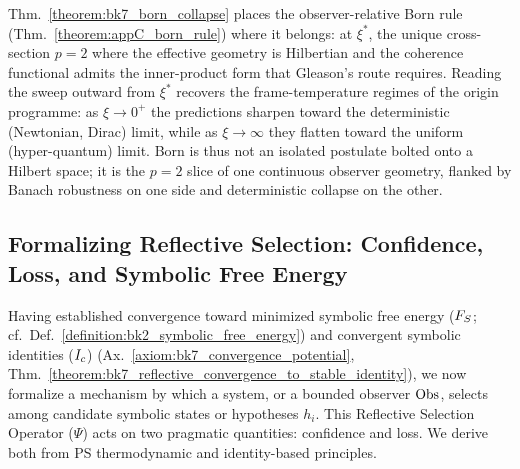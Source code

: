 \begin{scholium}
\label{scholium:bk7_born_as_hilbert_cross_section}
Thm.~\ref{theorem:bk7_born_collapse} places the observer-relative Born rule
(Thm.~\ref{theorem:appC_born_rule}) where it belongs: at $\xi^{\ast}$, the unique
cross-section $p=2$ where the effective geometry is Hilbertian and the coherence
functional admits the inner-product form that Gleason's route requires. Reading the
sweep outward from $\xi^{\ast}$ recovers the frame-temperature regimes of the
origin programme: as $\xi\to 0^{+}$ the predictions sharpen toward the
deterministic (Newtonian, Dirac) limit, while as $\xi\to\infty$ they flatten toward
the uniform (hyper-quantum) limit. Born is thus not an isolated postulate bolted
onto a Hilbert space; it is the $p=2$ slice of one continuous observer geometry,
flanked by Banach robustness on one side and deterministic collapse on the other.
\end{scholium}

\subsection{Formalizing Reflective Selection: Confidence, Loss, and Symbolic Free Energy}
\label{subsec:bk7_formalizing_reflective_selection_confidence_loss_and_symbolic_}
Having established convergence toward minimized symbolic free energy
(\(F_S\); cf.~Def.~\ref{definition:bk2_symbolic_free_energy}) and
convergent symbolic identities (\(I_c\))
(Ax.~\ref{axiom:bk7_convergence_potential},
Thm.~\ref{theorem:bk7_reflective_convergence_to_stable_identity}), we now
formalize a mechanism by which a system, or a bounded observer \(\mathrm{Obs}\),
selects among candidate symbolic states or hypotheses \(h_i\).
This Reflective Selection Operator (\(\Psi\)) acts on two pragmatic quantities:
confidence and loss.
We derive both from PS thermodynamic and identity-based principles.
